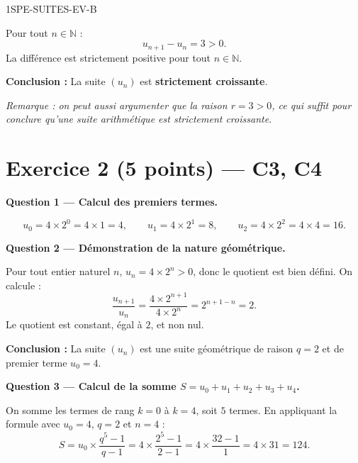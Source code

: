\begin{corrige}{1SPE-SUITES-EV-B}

Pour tout $n \in \mathbb{N}$ :
\[
  u_{n+1} - u_n = 3 > 0.
\]
La différence est strictement positive pour tout $n \in \mathbb{N}$.

\textbf{Conclusion :} La suite $(u_n)$ est \textbf{strictement croissante}.

\textit{Remarque : on peut aussi argumenter que la raison $r = 3 > 0$, ce qui suffit pour conclure qu'une suite arithmétique est strictement croissante.}

\section*{Exercice 2 \hfill (5 points) — C3, C4}


\bigskip
\textbf{Question 1 — Calcul des premiers termes.}


\[
  u_0 = 4 \times 2^0 = 4 \times 1 = 4, \qquad
  u_1 = 4 \times 2^1 = 8, \qquad
  u_2 = 4 \times 2^2 = 4 \times 4 = 16.
\]

\medskip
\textbf{Question 2 — Démonstration de la nature géométrique.}


Pour tout entier naturel $n$, $u_n = 4 \times 2^n > 0$, donc le quotient est bien défini. On calcule :
\[
  \frac{u_{n+1}}{u_n} = \frac{4 \times 2^{n+1}}{4 \times 2^n} = 2^{n+1-n} = 2.
\]
Le quotient est constant, égal à $2$, et non nul.

\textbf{Conclusion :} La suite $(u_n)$ est une suite géométrique de raison $q = 2$ et de premier terme $u_0 = 4$.

\medskip
\textbf{Question 3 — Calcul de la somme $S = u_0 + u_1 + u_2 + u_3 + u_4$.}


On somme les termes de rang $k = 0$ à $k = 4$, soit $5$ termes. En appliquant la formule avec $u_0 = 4$, $q = 2$ et $n = 4$ :
\[
  S = u_0 \times \frac{q^5 - 1}{q - 1} = 4 \times \frac{2^5 - 1}{2 - 1} = 4 \times \frac{32 - 1}{1} = 4 \times 31 = 124.
\]


\end{corrige}
